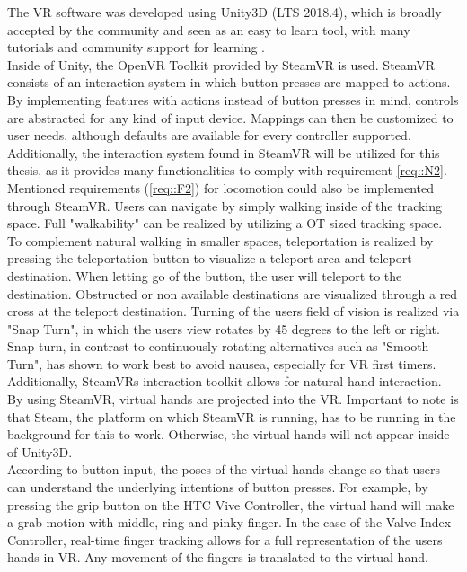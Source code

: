 The VR software was developed using Unity3D (LTS 2018.4), which is broadly accepted by the community and seen as an easy to learn tool, with many tutorials and community support for learning \cite{bartneck2015robot}.
\\ Inside of Unity, the OpenVR Toolkit provided by SteamVR is used.
SteamVR consists of an interaction system in which button presses are mapped to actions.
By implementing features with actions instead of button presses in mind, controls are abstracted for any kind of input device.
Mappings can then be customized to user needs, although defaults are available for every controller supported.
\\ Additionally, the interaction system found in SteamVR will be utilized for this thesis, as it provides many functionalities to comply with requirement \ref{req::N2}.
Mentioned requirements (\ref{req::F2}) for locomotion could also be implemented through SteamVR.
Users can navigate by simply walking inside of the tracking space.
Full "walkability" can be realized by utilizing a OT sized tracking space.
To complement natural walking in smaller spaces, teleportation is realized by pressing the teleportation button to visualize a teleport area and teleport destination.
When letting go of the button, the user will teleport to the destination.
Obstructed or non available destinations are visualized through a red cross at the teleport destination.
Turning of the users field of vision is realized via "Snap Turn", in which the users view rotates by 45 degrees to the left or right.
Snap turn, in contrast to continuously rotating alternatives such as "Smooth Turn", has shown to work best to avoid nausea, especially for VR first timers. 
\\ Additionally, SteamVRs interaction toolkit allows for natural hand interaction.
By using SteamVR, virtual hands are projected into the VR.
Important to note is that Steam, the platform on which SteamVR is running, has to be running in the background for this to work.
Otherwise, the virtual hands will not appear inside of Unity3D.
\\ According to button input, the poses of the virtual hands change so that users can understand the underlying intentions of button presses.
For example, by pressing the grip button on the HTC Vive Controller, the virtual hand will make a grab motion with middle, ring and pinky finger.
In the case of the Valve Index Controller, real-time finger tracking allows for a full representation of the users hands in VR.
Any movement of the fingers is translated to the virtual hand.
